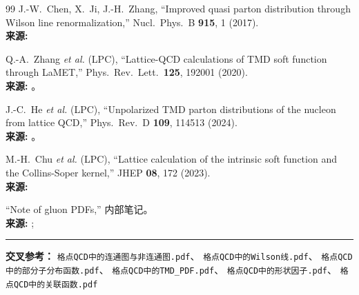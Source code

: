 \documentclass[12pt,a4paper]{ctexart}
\begin{document}
\begin{thebibliography}{99}
J.-W.~Chen, X.~Ji, J.-H.~Zhang,
``Improved quasi parton distribution through Wilson line renormalization,''
Nucl.\ Phys.\ B \textbf{915}, 1 (2017).
\\{\small\textbf{来源:} }

Q.-A.~Zhang \textit{et al.} (LPC),
``Lattice-QCD calculations of TMD soft function through LaMET,''
Phys.\ Rev.\ Lett.\ \textbf{125}, 192001 (2020).
\\{\small\textbf{来源:} }。

J.-C.~He \textit{et al.} (LPC),
``Unpolarized TMD parton distributions of the nucleon from lattice QCD,''
Phys.\ Rev.\ D \textbf{109}, 114513 (2024).
\\{\small\textbf{来源:} }。

M.-H.~Chu \textit{et al.} (LPC),
``Lattice calculation of the intrinsic soft function and the Collins-Soper kernel,''
JHEP \textbf{08}, 172 (2023).
\\{\small\textbf{来源:} }

``Note of gluon PDFs,'' 内部笔记。
\\{\small\textbf{来源:} ; }

\end{thebibliography}
\endgroup

\vspace{0.3cm}
\noindent\rule{\textwidth}{0.5pt}
\small
\textbf{交叉参考：} \texttt{格点QCD中的连通图与非连通图.pdf}、
\texttt{格点QCD中的Wilson线.pdf}、
\texttt{格点QCD中的部分子分布函数.pdf}、
\texttt{格点QCD中的TMD\_PDF.pdf}、
\texttt{格点QCD中的形状因子.pdf}、
\texttt{格点QCD中的关联函数.pdf}
\end{document}
